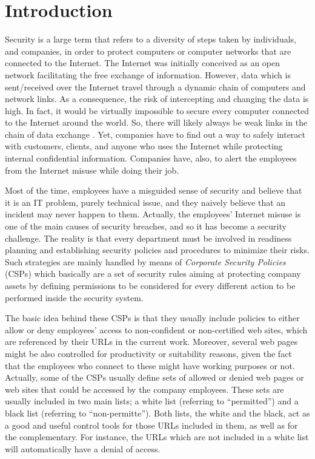\documentclass{llncs}
\begin{document}
%
%
\section{Introduction}
\label{sec:introduction}

\noindent Security is a large term that refers to a diversity of steps taken by individuals, and companies, in order to protect computers or computer networks that are connected to the Internet. The Internet was initially conceived as an open network facilitating the free exchange of information. However, data which is sent/received over the Internet travel through a dynamic chain of computers and network links. As a consequence, the risk of intercepting and changing the data is high. In fact, it would be virtually impossible to secure every computer connected to the Internet around the world. So, there will likely always be weak links in the chain of data exchange \cite{cheswick2003firewalls}. Yet, companies have to find out a way to safely interact with customers, clients, and anyone who uses the Internet while protecting internal confidential information. Companies have, also, to alert the employees from the Internet misuse while doing their job.
 
Most of the time, employees have a misguided sense of security and believe that it is an IT problem, purely technical issue, and they naively believe that an incident may never happen to them. Actually, the employees' Internet misuse is one of the main causes of security breaches, and so it has become a security challenge. The reality is that every department must be involved in readiness planning and establishing security policies and procedures to minimize their risks. Such strategies are mainly handled by means of \textit{Corporate Security Policies} (CSPs) which basically are a set of security rules aiming at protecting company assets by defining permissions to be considered for every different action to be performed inside the security system.
 
The basic idea behind these CSPs is that they usually include policies to either allow or deny employees' access to non-confident or non-certified web sites, which are referenced by their URLs in the current work. Moreover, several web pages might be also controlled for productivity or suitability reasons, given the fact that the employees who connect to these might have working purposes or not. Actually, some of the CSPs usually define sets of allowed or denied web pages or web sites that could be accessed by the company employees. These sets are usually included in two main lists; a white list (referring to ``permitted'') and a black list (referring to ``non-permitte''). Both lists, the white and the black, act as a good and useful control tools for those URLs included in them, as well as for the complementary. For instance, the URLs which are not included in a white list will automatically have a denial of access.
\end{document}
